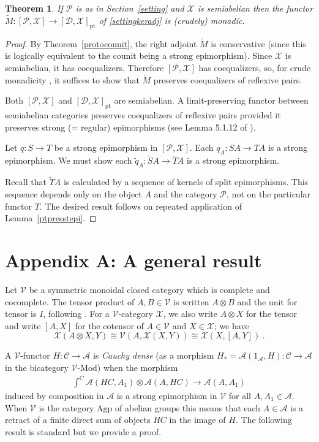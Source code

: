 \documentclass[a4paper,12pt,reqno]{amsart}
\newtheorem{theorem}{Theorem}[section] %
\theoremstyle{definition}
\theoremstyle{fact}
\theoremstyle{genquest}
\theoremstyle{step}
\newcommand{\dd}{\colon}
\newcommand{\ra}{\rightarrow}
\def\CA{{\mathscr A}}
\def\CC{{\mathscr C}}
\def\CD{{\mathscr D}}
\def\CP{{\mathscr P}}
\def\CV{{\mathscr V}}
\def\CX{{\mathscr X}}
\begin{document}
\begin{theorem}
If $\CP$ is as in Section~\ref{setting} and $\CX$ is semiabelian then the functor
$\widetilde{M} \dd [\CP,\CX] \ra [\CD,\CX]_{\mathrm{pt}}$
of \eqref{settingkeradj} is (crudely) monadic.
\end{theorem}
 \begin{proof}
 By Theorem~\ref{protocounit}, the right adjoint $\widetilde{M}$ is conservative 
 (since this is logically equivalent to the counit being a strong epimorphism).
 Since $\CX$ is semiabelian, it has coequalizers. 
 Therefore $[\CP,\CX]$ has coequalizers, so, for crude monadicity \cite{CWM}, 
 it suffices to show that $\widetilde{M}$ preserves coequalizers of reflexive pairs.
 
 Both $[\CP,\CX]$ and $[\CD,\CX]_{\mathrm{pt}}$ are semiabelian.
 A limit-preserving functor between semiabelian categories preserves coequalizers of
 reflexive pairs provided it preserves strong (= regular) epimorphisms 
 (see Lemma 5.1.12 of \cite{BorBou04}).
 
 Let $q:S\ra T$ be a strong epimorphism in $[\CP,\CX]$.
 Each $q_A:SA\ra TA$ is a strong epimorphism.
 We must show each $\widetilde{q}_A:\widetilde{S}A\ra \widetilde{T}A$ is a strong epimorphism.
 
 Recall that $\widetilde{T}A$ is calculated by a sequence of kernels of split epimorphisms.
 This sequence depends only on the object $A$ and the category $\CP$, not on the
 particular functor $T$. 
 The desired result follows on repeated application of Lemma~\ref{ptpresstepi}.   
  \end{proof}
  
  \section{Appendix A: A general result}\label{gr}

Let $\CV$ be a symmetric monoidal closed category which is complete and cocomplete. 
The tensor product of $A, B\in \CV$ is written $A\otimes B$ and the unit for
tensor is $I$, following \cite{KellyBook}.
For a $\CV$-category $\CX$, we also write $A\otimes X$ for the tensor and
write $[A,X]$ for the cotensor of $A\in \CV$ and $X\in \CX$; 
we have
$$\CX(A\otimes X,Y)\cong \CV(A,\CX(X,Y)) \cong \CX(X,[A,Y]) \ .$$

A $\CV$-functor $H\dd \CC \ra \CA$ is {\em Cauchy dense} 
(as a morphism $H_*=\CA(1_{\CA},H)\dd \CC \ra \CA$
in the bicategory $\CV\text{-}\mathrm{Mod}$) when the morphism
\begin{eqnarray}\label{cd}
\int^C{\CA(HC,A_1)\otimes \CA(A,HC)}\ra \CA(A,A_1)
\end{eqnarray} 
induced by composition in $\CA$ is a strong epimorphism in $\CV$ 
for all $A, A_1\in \CA$. 
When $\CV$ is the category $\mathrm{Agp}$ of abelian groups this means that each
$A\in \CA$ is a retract of a finite direct sum of objects $HC$ in the image of $H$. 
The following result is standard but we provide a proof.
\end{document}
